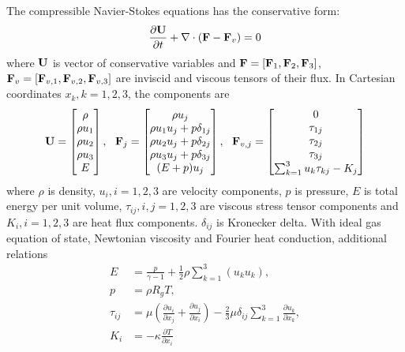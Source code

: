 \documentclass[preprint,12pt]{elsarticle}
\begin{document}
The compressible Navier-Stokes equations has the conservative form:
\begin{equation}
    \label{eq:NS}
    \frac{\partial \mathbf{U}}{\partial t} +
    \mathbf\nabla \cdot (\mathbf{F} - \mathbf{F}_v)  = 0
\end{equation}
where $\mathbf{U}$ is vector of conservative variables and
$\mathbf{F}=[\mathbf{F}_1,\mathbf{F}_2,\mathbf{F}_3]$,
$\mathbf{F}_v=[\mathbf{F}_{v,1},\mathbf{F}_{v,2},\mathbf{F}_{v,3}]$
are
inviscid and viscous tensors of
their flux.
In Cartesian coordinates $x_k, k=1,2,3$, the components are
\begin{equation}
    \mathbf{U} = \begin{bmatrix}
        \rho \\ \rho u_1 \\ \rho u_2 \\ \rho u_3 \\ E
    \end{bmatrix},\ \
    \mathbf{F}_j = \begin{bmatrix}
        \rho u_j                   \\
        \rho u_1u_j + p\delta_{1j} \\
        \rho u_2u_j + p\delta_{2j} \\
        \rho u_3u_j + p\delta_{3j} \\
        (E+p)u_j                   \\
    \end{bmatrix},\ \
    \mathbf{F}_{v,j} = \begin{bmatrix}
        0                                \\
        \tau_{1j}                        \\
        \tau_{2j}                        \\
        \tau_{3j}                        \\
        \sum_{k=1}^3{u_k\tau_{kj}} - K_j \\
    \end{bmatrix}
\end{equation}
where $\rho$ is density,
$u_i, i=1,2,3$ are velocity components,
$p$ is pressure,
$E$ is total energy per unit volume,
$\tau_{ij}, i,j=1,2,3$ are viscous stress tensor components
and
$K_i, i=1,2,3$ are heat flux components.
$\delta_{ij}$ is
Kronecker delta.
With ideal gas equation of state,
Newtonian viscosity and Fourier
heat conduction, additional relations
\begin{equation}
    \begin{aligned}
        E         & = \frac{p}{\gamma -1 } + \frac{1}{2}\rho\sum_{k=1}^{3}(u_ku_k),  \\
        p         & =\rho R_g T                                              ,       \\
        \tau_{ij} & =
        \mu\left(\frac{\partial u_i}{\partial x_j} + \frac{\partial u_j}{\partial x_i}\right)
        -
        \frac{2}{3}\mu \delta_{ij}\sum_{k=1}^{3}{\frac{\partial u_k}{\partial x_k}}, \\
        K_i       & = - \kappa \frac{\partial T}{\partial x_i}
    \end{aligned}
\end{equation}
\end{document}
